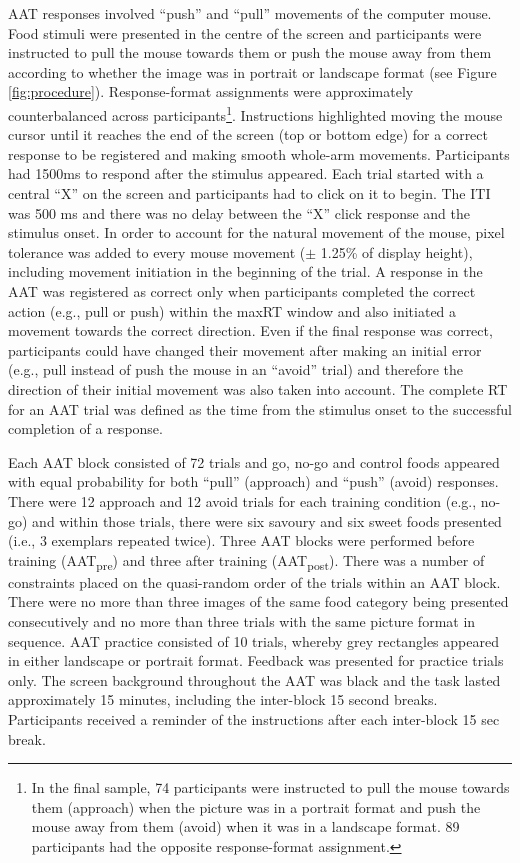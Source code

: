 \documentclass[man,floatsintext]{apa6}
\let\rmarkdownfootnote\footnote%
\def\footnote{\protect\rmarkdownfootnote}
\begin{document}
AAT responses involved \enquote{push} and \enquote{pull} movements of the computer mouse. Food stimuli were presented in the centre of the screen and participants were instructed to pull the mouse towards them or push the mouse away from them according to whether the image was in portrait or landscape format (see Figure \ref{fig:procedure}). Response-format assignments were approximately counterbalanced across participants\footnote{In the final sample, 74 participants were instructed to pull the mouse towards them (approach) when the picture was in a portrait format and push the mouse away from them (avoid) when it was in a landscape format. 89 participants had the opposite response-format assignment.}. Instructions highlighted moving the mouse cursor until it reaches the end of the screen (top or bottom edge) for a correct response to be registered and making smooth whole-arm movements. Participants had 1500ms to respond after the stimulus appeared. Each trial started with a central \enquote{X} on the screen and participants had to click on it to begin. The ITI was 500 ms and there was no delay between the \enquote{X} click response and the stimulus onset. In order to account for the natural movement of the mouse, pixel tolerance was added to every mouse movement (\(\pm\) 1.25\% of display height), including movement initiation in the beginning of the trial. A response in the AAT was registered as correct only when participants completed the correct action (e.g., pull or push) within the maxRT window and also initiated a movement towards the correct direction. Even if the final response was correct, participants could have changed their movement after making an initial error (e.g., pull instead of push the mouse in an \enquote{avoid} trial) and therefore the direction of their initial movement was also taken into account. The complete RT for an AAT trial was defined as the time from the stimulus onset to the successful completion of a response.

\par

Each AAT block consisted of 72 trials and go, no-go and control foods appeared with equal probability for both \enquote{pull} (approach) and \enquote{push} (avoid) responses. There were 12 approach and 12 avoid trials for each training condition (e.g., no-go) and within those trials, there were six savoury and six sweet foods presented (i.e., 3 exemplars repeated twice). Three AAT blocks were performed before training (AAT\textsubscript{pre}) and three after training (AAT\textsubscript{post}). There was a number of constraints placed on the quasi-random order of the trials within an AAT block. There were no more than three images of the same food category being presented consecutively and no more than three trials with the same picture format in sequence. AAT practice consisted of 10 trials, whereby grey rectangles appeared in either landscape or portrait format. Feedback was presented for practice trials only. The screen background throughout the AAT was black and the task lasted approximately 15 minutes, including the inter-block 15 second breaks. Participants received a reminder of the instructions after each inter-block 15 sec break.
\end{document}
